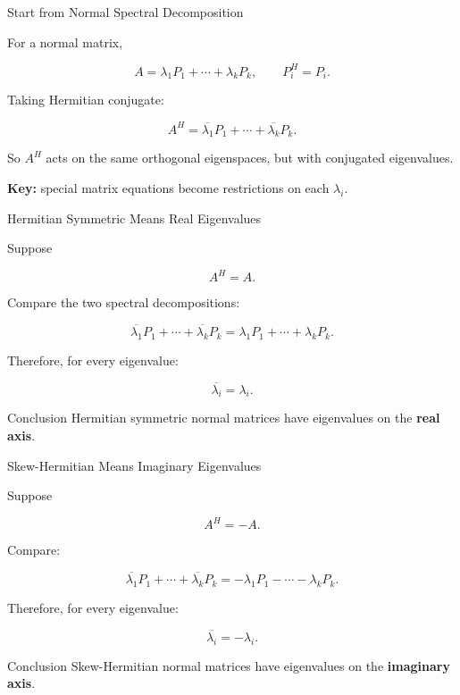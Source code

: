 \documentclass[10pt]{beamer}
\theoremstyle{definition}
\newcommand{\x}[1]{\alert{\textbf{#1}}}
\begin{document}
\begin{frame}{Start from Normal Spectral Decomposition}

For a normal matrix,

$$
A=\lambda_1P_1+\cdots+\lambda_kP_k,
\qquad
P_i^H=P_i.
$$

\vfill\pause

Taking Hermitian conjugate:

$$
A^H=\overline{\lambda_1}P_1+\cdots+\overline{\lambda_k}P_k.
$$

\vfill

So $A^H$ acts on the same orthogonal eigenspaces, but with conjugated eigenvalues.

\vfill

\x{Key:} special matrix equations become restrictions on each $\lambda_i$.

\end{frame}


\begin{frame}{Hermitian Symmetric Means Real Eigenvalues}

Suppose

$$
A^H=A.
$$

\vfill

Compare the two spectral decompositions:

$$
\overline{\lambda_1}P_1+\cdots+\overline{\lambda_k}P_k
=
\lambda_1P_1+\cdots+\lambda_kP_k.
$$

\vfill\pause

Therefore, for every eigenvalue:

$$
\overline{\lambda_i}=\lambda_i.
$$

\vfill

\begin{block}{Conclusion}
Hermitian symmetric normal matrices have eigenvalues on the \x{real axis}.
\end{block}

\end{frame}


\begin{frame}{Skew-Hermitian Means Imaginary Eigenvalues}

Suppose

$$
A^H=-A.
$$

\vfill

Compare:

$$
\overline{\lambda_1}P_1+\cdots+\overline{\lambda_k}P_k
=
-\lambda_1P_1-\cdots-\lambda_kP_k.
$$

\vfill\pause

Therefore, for every eigenvalue:

$$
\overline{\lambda_i}=-\lambda_i.
$$

\vfill

\begin{block}{Conclusion}
Skew-Hermitian normal matrices have eigenvalues on the \x{imaginary axis}.
\end{block}

\end{frame}
\end{document}
